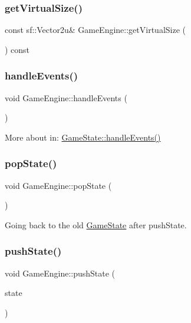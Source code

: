 \subsubsection{\texorpdfstring{getVirtualSize()}{getVirtualSize()}}
{\footnotesize\ttfamily const sf\+::\+Vector2u\& Game\+Engine\+::get\+Virtual\+Size (\begin{DoxyParamCaption}{ }\end{DoxyParamCaption}) const\hspace{0.3cm}{\ttfamily [inline]}}

\mbox{\label{class_game_engine_a15e2e71a499386e3a19bbba361be4377}} 
\subsubsection{\texorpdfstring{handleEvents()}{handleEvents()}}
{\footnotesize\ttfamily void Game\+Engine\+::handle\+Events (\begin{DoxyParamCaption}{ }\end{DoxyParamCaption})}



More about in\+: \mbox{\hyperlink{class_game_state_a3ef0638514dbfe71581d593cf0f66ce5}{Game\+State\+::handle\+Events()}} 

\mbox{\label{class_game_engine_a21d2ebf3778429727595a8b87893314f}} 
\subsubsection{\texorpdfstring{popState()}{popState()}}
{\footnotesize\ttfamily void Game\+Engine\+::pop\+State (\begin{DoxyParamCaption}{ }\end{DoxyParamCaption})}



Going back to the old \mbox{\hyperlink{class_game_state}{Game\+State}} after push\+State. 

\mbox{\label{class_game_engine_a082e38033f8dc63b2d130a0cfd3fbdd9}} 
\subsubsection{\texorpdfstring{pushState()}{pushState()}}
{\footnotesize\ttfamily void Game\+Engine\+::push\+State (\begin{DoxyParamCaption}\item[{\mbox{\hyperlink{class_game_state}{Game\+State}} $\ast$}]{state }\end{DoxyParamCaption})}



